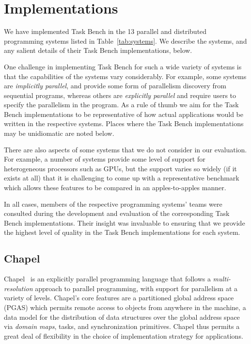 \section{Implementations}
\label{sec:implementation}



We have implemented Task Bench in the 13 parallel and distributed
programming systems listed in Table~\ref{tab:systems}. We describe the
systems, and any salient details of their Task Bench implementations,
below.

One challenge in implementing Task Bench for such a wide variety of
systems is that the capabilities of the systems vary considerably. For
example, some systems are \emph{implicitly parallel}, and provide some
form of parallelism discovery from sequential programs, whereas others
are \emph{explicitly parallel} and require users to specify the
parallelism in the program. As a rule of thumb we aim for the Task
Bench implementations to be representative of how actual applications
would be written in the respective systems. Places where the Task
Bench implementations may be unidiomatic are noted below.

There are also aspects of some systems that we do not consider in our
evaluation. For example, a number of systems provide some level of
support for heterogeneous processors such as GPUs, but the support
varies so widely (if it exists at all) that it is challenging to come
up with a representative benchmark which allows these features to be
compared in an apples-to-apples manner.

In all cases, members of the respective programming systems' teams
were consulted during the development and evaluation of the
corresponding Task Bench implementations. Their insight was invaluable
to ensuring that we provide the highest level of quality in the Task
Bench implementations for each system.

\subsection{Chapel}

Chapel~\cite{Chapel07} is an explicitly parallel programming language
that follows a \emph{multi-resolution} approach to parallel
programming, with support for parallelism at a variety of
levels. Chapel's core features are a partitioned global address space
(PGAS) which permits remote access to objects from anywhere in the
machine, a data model for the distribution of data structures over the
global address space via \emph{domain maps}, tasks, and
synchronization primitives. Chapel thus permits a great deal of
flexibility in the choice of implementation strategy for applications.

